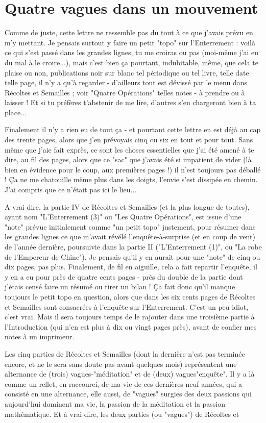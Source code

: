 \section{Quatre vagues dans un mouvement}

Comme de juste, cette lettre ne ressemble pas du tout à ce que j'avais prévu en m'y mettant. Je pensais surtout y faire un petit "topo" sur l'Enterrement : voilà ce qui s'est passé dans les grandes lignes, tu me croiras ou pas (moi-même j'ai eu du mal à le croire...), mais c'est bien ça pourtant, indubitable, même, que cela te plaise ou non, publications noir sur blanc tel périodique ou tel livre, telle date telle page, il n'y a qu'à regarder - d'ailleurs tout est dévissé par le menu dans Récoltes et Semailles ; voir "Quatre Opérations" telles notes - à prendre ou à laisser ! Et si tu préfères t'abstenir de me lire, d'autres s'en chargeront bien à ta place...

Finalement il n'y a rien eu de tout ça - et pourtant cette lettre en est déjà au cap des trente pages, alors que j'en prévoyais cinq ou six en tout et pour tout. Sans même que j’aie fait exprès, ce sont les choses essentielles que j'ai été amené à te dire, au fil des pages, alors que ce "sac" que j'avais été si impatient de vider (là bien en évidence pour le coup, aux premières pages !) il n'est toujours pas déballé ! Ça ne me chatouille même plus dans les doigts, l'envie s'est dissipée en chemin. J'ai compris que ce n'était pas ici le lieu...

A vrai dire, la partie IV de Récoltes et Semailles (et la plus longue de toutes), ayant nom "L'Enterrement (3)" ou "Les Quatre Opérations", est issue d'une "note" prévue initialement comme "un petit topo" justement, pour résumer dans les grandes lignes ce que m'avait révélé l'enquête-à-surprise (et en coup de vent) de l'année dernière, poursuivie dans la partie II ("L'Enterrement (1)", ou "La robe de l'Empereur de Chine"). Je pensais qu'il y en aurait pour une "note" de cinq ou dix pages, pas plus. Finalement, de fil en aiguille, cela a fait repartir l'enquête, il y en a eu pour près de quatre cents pages - près du double de la partie dont j'étais censé faire un résumé ou tirer un bilan ! Ça fait donc qu'il manque toujours le petit topo en question, alors que dans les six cents pages de Récoltes et Semailles sont consacrées à l'enquête sur l'Enterrement. C'est un peu idiot, c'est vrai. Mais il sera toujours temps de le rajouter dans une troisième partie à l'Introduction (qui n'en est plus à dix ou vingt pages près), avant de confier mes notes à un imprimeur.

Les cinq parties de Récoltes et Semailles (dont la dernière n'est pas terminée encore, et ne le sera sans doute pas avant quelques mois) représentent une alternance de (trois) vagues-"méditation" et de (deux) vagues"enquête". Il y a là comme un reflet, en raccourci, de ma vie de ces dernières neuf années, qui a consisté en une alternance, elle aussi, de "vagues" surgies des deux passions qui aujourd'hui dominent ma vie, la passion de la méditation et la passion mathématique. Et à vrai dire, les deux parties (ou "vagues") de Récoltes et
